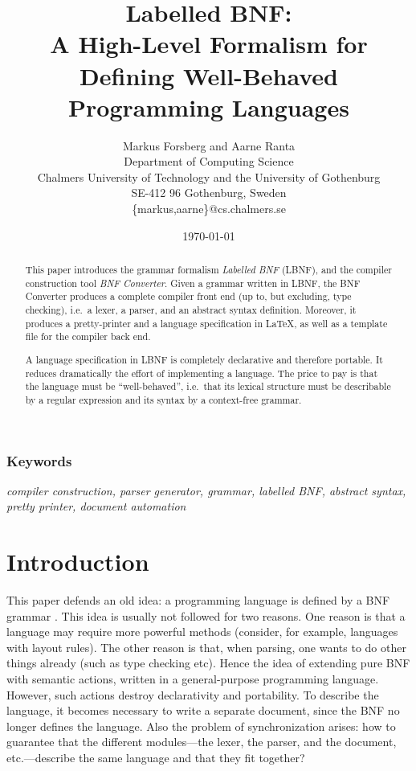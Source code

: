 \documentclass[10pt]{article}
\title{{\Large \bf Labelled BNF: \\
       A High-Level Formalism for Defining Well-Behaved Programming Languages} \\}
\author{ Markus Forsberg and Aarne Ranta \\
  Department of Computing Science \\
  Chalmers University of Technology and the University of Gothenburg \\
  SE-412 96 Gothenburg, Sweden\\
  \{markus,aarne\}@cs.chalmers.se}
\date{\today}
\begin{document}
\maketitle


\begin{abstract}
This paper introduces
the grammar formalism \textit{Labelled BNF} (LBNF),
and the compiler construction tool
\textit{BNF Converter}.
Given a grammar written in LBNF,
the BNF Converter produces a complete compiler
front end (up to, but excluding, type checking),
i.e.\ a lexer, a parser, and an abstract
syntax definition. Moreover, it produces a pretty-printer
and a language specification in \LaTeX, as well as
a template file for the compiler back end.

A language specification in LBNF is completely declarative and therefore
portable. It reduces dramatically the effort of implementing a language.
The price to pay is that the language must be ``well-behaved'', i.e.\ that
its lexical structure must be describable by a regular expression and
its syntax by a context-free grammar.

\end{abstract}

\subsubsection*{Keywords}

\textit{compiler construction, parser generator, grammar, labelled BNF,
        abstract syntax, pretty printer, document automation}

\section{Introduction}

This paper defends an old idea:
a programming language is defined by a BNF grammar \cite{algol}.
This idea is usually not followed for two reasons. One reason is that
a language may require more
powerful methods (consider, for example, languages with layout rules). The
other reason is that, when parsing, one wants to do other things already
(such as type checking etc).
Hence the idea of extending pure BNF with semantic actions,
written in a general-purpose
programming language. However, such actions destroy declarativity and portability.
To describe the language, it becomes
necessary to write a separate document, since the BNF no longer defines
the language. Also the problem of synchronization arises: how to
guarantee that the different modules---the lexer, the parser,
and the document, etc.---describe the same language and that they fit together?
\end{document}
